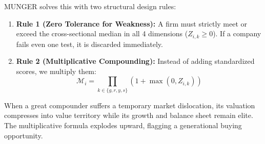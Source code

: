 \documentclass[10pt,twocolumn]{article}
\begin{document}
MUNGER solves this with two structural design rules:
\begin{enumerate}
    \item \textbf{Rule 1 (Zero Tolerance for Weakness):} A firm must strictly meet or exceed the cross-sectional median in all 4 dimensions ($Z_{i,k} \ge 0$). If a company fails even one test, it is discarded immediately.
    \item \textbf{Rule 2 (Multiplicative Compounding):} Instead of adding standardized scores, we multiply them:
    \begin{equation}
        \mathcal{M}_i = \prod_{k \in \{g,r,y,s\}} \left(1 + \max(0, Z_{i,k})\right)
    \end{equation}
\end{enumerate}
When a great compounder suffers a temporary market dislocation, its valuation compresses into value territory while its growth and balance sheet remain elite. The multiplicative formula explodes upward, flagging a generational buying opportunity.
\end{document}
